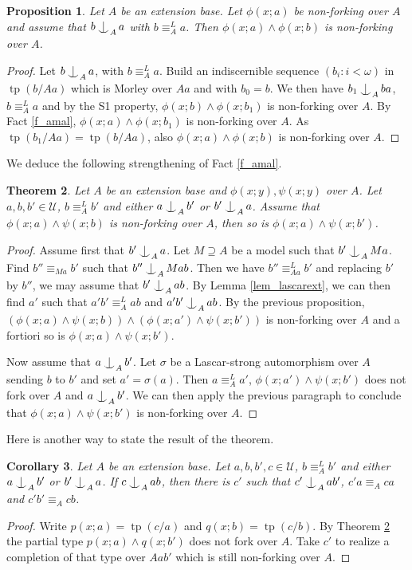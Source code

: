 \documentclass{amsart}
\makeatletter
\numberwithin{equation}{section}
\newtheorem{thm}{Theorem}[section]
\newtheorem{cor}[thm]{Corollary}
\newtheorem{prop}[thm]{Proposition}
\theoremstyle{definition}
\theoremstyle{mystyle}
\theoremstyle{remark}
\newcommand{\monster}{\mathcal U}
\DeclareMathOperator{\tp}{tp}
\def\indsym#1#2{%
 \setbox0=\hbox{$\m@th#1x$}%
 \kern\wd0%
 \hbox to 0pt{\hss$\m@th#1\mid$\hbox to 0pt{$\m@th#1^{#2}$\hss}\hss}%
 \lower.9\ht0\hbox to 0pt{\hss$\m@th#1\smile$\hss}%
 \kern\wd0}
\newcommand{\ind}[1][]{\mathop{\mathpalette\indsym{#1}}}
\makeatother
\begin{document}
\begin{prop}
Let $A$ be an extension base. Let $\phi(x;a)$ be non-forking over $A$ and assume that $b\ind_A a$ with $b\equiv_A^ L a$. Then $\phi(x;a)\wedge \phi(x;b)$ is non-forking over $A$.
\end{prop}
\begin{proof}
Let $b\ind_A a$, with $b \equiv_A^ L a$. Build an indiscernible sequence $(b_i:i<\omega)$ in $\tp(b/Aa)$ which is Morley over $Aa$ and with $b_0 = b$. We then have $b_1 \ind_A ba$, $b \equiv_A^ L a$ and by the S1 property, $\phi(x;b)\wedge \phi(x;b_1)$ is non-forking over $A$. By Fact \ref{f_amal}, $\phi(x;a)\wedge \phi(x;b_1)$ is non-forking over $A$. As $\tp(b_1/Aa)=\tp(b/Aa)$, also $\phi(x;a)\wedge \phi(x;b)$ is non-forking over $A$.
\end{proof}

We deduce the following strengthening of Fact \ref{f_amal}.

\begin{thm}\label{th_amalg}
Let $A$ be an extension base and $\phi(x;y),\psi(x;y)$ over $A$. Let $a,b,b'\in \monster$, $b\equiv_A^ L b'$ and either $a\ind_A b'$ or $b'\ind_A a$. Assume that $\phi(x;a)\wedge \psi(x;b)$ is non-forking over $A$, then so is $\phi(x;a)\wedge \psi(x;b')$.
\end{thm}
\begin{proof}
Assume first that $b'\ind_A a$. Let $M\supseteq A$ be a model such that $b'\ind_A Ma$. Find $b''\equiv_{Ma} b'$ such that $b''\ind_A Mab$. Then we have $b'' \equiv_{Aa}^L b'$ and replacing $b'$ by $b''$, we may assume that $b'\ind_A ab$. By Lemma \ref{lem_lascarext}, we can then find $a'$ such that $a'b'\equiv_A^L ab$ and $a'b'\ind_A ab$. By the previous proposition, $(\phi(x;a)\wedge \psi(x;b))\wedge (\phi(x;a')\wedge \psi(x;b'))$ is non-forking over $A$ and a fortiori so is $\phi(x;a)\wedge \psi(x;b')$.

Now assume that $a\ind_A b'$. Let $\sigma$ be a Lascar-strong automorphism over $A$ sending $b$ to $b'$ and set $a'=\sigma(a)$. Then $a\equiv_A ^L a'$, $\phi(x;a')\wedge \psi(x;b')$ does not fork over $A$ and $a\ind_A b'$. We can then apply the previous paragraph to conclude that $\phi(x;a)\wedge \psi(x;b')$ is non-forking over $A$.
\end{proof}

Here is another way to state the result of the theorem.

\begin{cor}\label{cor_amal}
Let $A$ be an extension base. Let $a,b,b',c\in \monster$, $b\equiv_A^ L b'$ and either $a\ind_A b'$ or $b'\ind_A a$. If $c\ind_{A} ab$, then there is $c'$ such that $c'\ind_A ab'$, $c'a\equiv_A ca$ and $c'b'\equiv_A cb$.
\end{cor}
\begin{proof}
Write $p(x;a)=\tp(c/a)$ and $q(x;b)=\tp(c/b)$. By Theorem \ref{th_amalg} the partial type $p(x;a)\wedge q(x;b')$ does not fork over $A$. Take $c'$ to realize a completion of that type over $Aab'$ which is still non-forking over $A$.
\end{proof}
\end{document}
